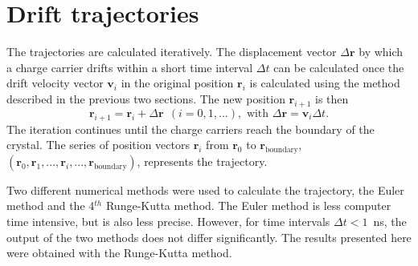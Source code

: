  
\section{Drift trajectories } 
\label{sec:pss:trj} 
The trajectories are calculated iteratively.  The displacement vector
$\Delta \mathbf{r}$ by which a charge carrier drifts within a short
time interval $\Delta t$ can be calculated once the drift velocity
vector $\mathbf{v}_{i}$ in the original position $\mathbf{r}_{i}$ is
calculated using the method described in the previous two sections.
The new position $\mathbf{r}_{i+1}$ is then
\begin{equation} 
\label{eq:pss:pos} 
\mathbf{r}_{i+1} = \mathbf{r}_{i} + \Delta \mathbf{r} \ \ (i=0,1,...), \text{ with } \Delta \mathbf{r} = \mathbf{v}_{i} \Delta t. 
\end{equation} 
The iteration continues until the charge carriers reach the boundary
of the crystal. The series of position vectors $\mathbf{r}_{i}$ from
$\mathbf{r}_{0}$ to $\mathbf{r}_{\text{boundary}}$, $(\mathbf{r}_{0},
\mathbf{r}_{1}, ..., \mathbf{r}_{i}, ...,
\mathbf{r}_{\text{boundary}})$, represents the trajectory.
 
Two different numerical methods were used to calculate the trajectory,
the Euler method and the 4$^{th}$ Runge-Kutta method.  The Euler
method is less computer time intensive, but is also less precise.
However, for time intervals $\Delta t < 1$~ns, the output of the two
methods does not differ significantly.  The results presented here
were obtained with the Runge-Kutta method.
 
